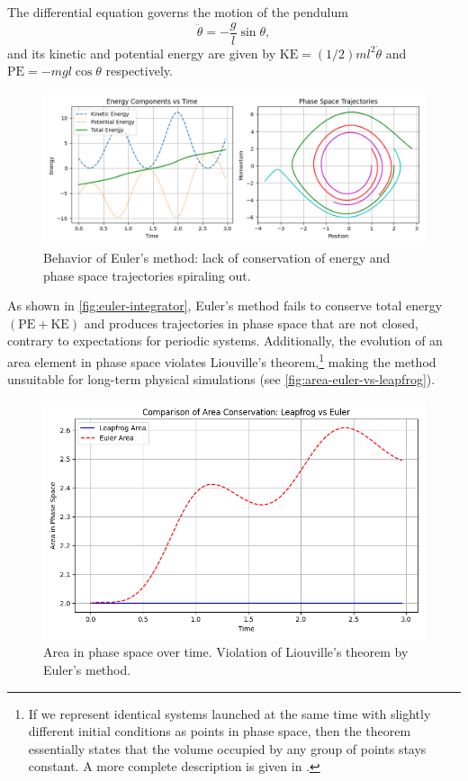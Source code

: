 The differential equation governs the motion of the pendulum
\begin{equation*}
    \ddot{\theta} = -\frac{g}{l}\sin\theta,
\end{equation*}
and its kinetic and potential energy are given by $\textrm{KE} = (1/2)ml^2\dot{\theta}$ and $\textrm{PE} = -mgl\cos\theta$ respectively.
\begin{figure}[htp]
    \centering
    \includegraphics[scale=0.6]{chapters/time-integration/img/euler-pendulum.png}
    \caption{Behavior of Euler's method: lack of conservation of energy and phase space trajectories spiraling out.}
    \label{fig:euler-integrator}
\end{figure}
As shown in \autoref{fig:euler-integrator}, Euler's method fails to conserve total energy $(\textrm{PE} + \textrm{KE})$ and produces trajectories in phase space that are not closed, contrary to expectations for periodic systems.
Additionally, the evolution of an area element in phase space violates Liouville's theorem,\footnote{If we represent identical systems launched at the same time with slightly different initial conditions as points in phase space, then the theorem essentially states that the volume occupied by any group of points stays constant.
    A more complete description is given in \cite{taylor2005classical}.
}
making the method unsuitable for long-term physical simulations (see \autoref{fig:area-euler-vs-leapfrog}).
\begin{figure}[htp]
    \centering
    \includegraphics[scale=0.4]{chapters/time-integration/img/area-leap-vs-euler.png}
    \caption{Area in phase space over time. Violation of Liouville's theorem by Euler's method.}
    \label{fig:area-euler-vs-leapfrog}
\end{figure}